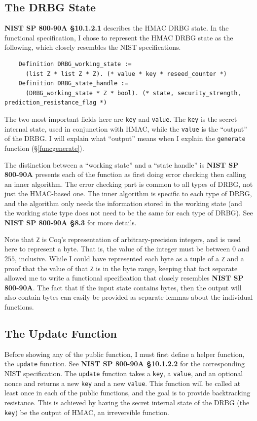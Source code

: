 \documentclass[pageno]{jpaper}
\newcommand{\stdtitle}[1]{\textbf{#1}}
\begin{document}
\subsection{The DRBG State} \label{funcstate}

\stdtitle{NIST SP 800-90A \S 10.1.2.1} describes the HMAC DRBG state. In the functional specification, I chose to represent the HMAC DRBG state as the following, which closely resembles the NIST specifications.

\begin{lstlisting}
    Definition DRBG_working_state :=
      (list Z * list Z * Z). (* value * key * reseed_counter *)
    Definition DRBG_state_handle :=
      (DRBG_working_state * Z * bool). (* state, security_strength, prediction_resistance_flag *)
\end{lstlisting}

The two most important fields here are \lstinline{key} and \lstinline{value}. The \lstinline{key} is the secret internal state, used in conjunction with HMAC, while the \lstinline{value} is the “output” of the DRBG. I will explain what “output” means when I explain the \lstinline{generate} function (\S \ref{funcgenerate}).

The distinction between a “working state” and a “state handle” is \stdtitle{NIST SP 800-90A} presents each of the function as first doing error checking then calling an inner algorithm. The error checking part is common to all types of DRBG, not just the HMAC-based one. The inner algorithm is specific to each type of DRBG, and the algorithm only needs the information stored in the working state (and the working state type does not need to be the same for each type of DRBG). See \stdtitle{NIST SP 800-90A \S 8.3} for more details.

Note that \lstinline{Z} is Coq’s representation of arbitrary-precision integers, and is used here to represent a byte. That is, the value of the integer must be between $0$ and $255$, inclusive. While I could have represented each byte as a tuple of a \lstinline{Z} and a proof that the value of that \lstinline{Z} is in the byte range, keeping that fact separate allowed me to write a functional specification that closely resembles \stdtitle{NIST SP 800-90A}. The fact that if the input state contains bytes, then the output will also contain bytes can easily be provided as separate lemmas about the individual functions.

\subsection{The Update Function}
Before showing any of the public function, I must first define a helper function, the \lstinline{update} function. See \stdtitle{NIST SP 800-90A \S 10.1.2.2} for the corresponding NIST specification. The \lstinline{update} function takes a \lstinline{key}, a \lstinline{value}, and an optional nonce and returns a new \lstinline{key} and a new \lstinline{value}. This function will be called at least once in each of the public functions, and the goal is to provide backtracking resistance. This is achieved by having the secret internal state of the DRBG (the \lstinline{key}) be the output of HMAC, an irreversible function.
\end{document}
